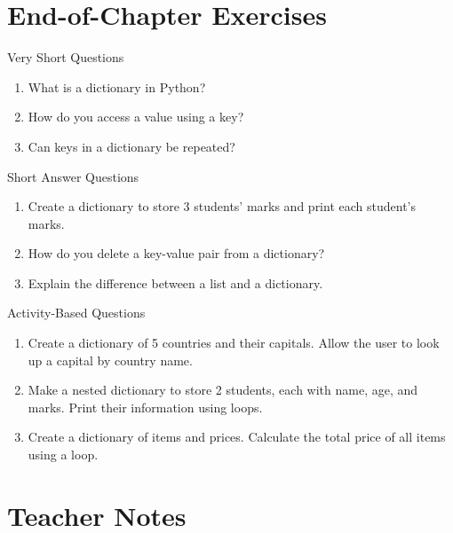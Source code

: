 \section{End-of-Chapter Exercises}

\begin{exercise}{Very Short Questions}
\begin{enumerate}
    \item What is a dictionary in Python?  
    \item How do you access a value using a key?  
    \item Can keys in a dictionary be repeated?  
\end{enumerate}
\end{exercise}

\begin{exercise}{Short Answer Questions}
\begin{enumerate}
    \item Create a dictionary to store 3 students’ marks and print each student’s marks.  
    \item How do you delete a key-value pair from a dictionary?  
    \item Explain the difference between a list and a dictionary.  
\end{enumerate}
\end{exercise}

\begin{exercise}{Activity-Based Questions}
\begin{enumerate}
    \item Create a dictionary of 5 countries and their capitals. Allow the user to look up a capital by country name.  
    \item Make a nested dictionary to store 2 students, each with name, age, and marks. Print their information using loops.  
    \item Create a dictionary of items and prices. Calculate the total price of all items using a loop.  
\end{enumerate}
\end{exercise}

\section{Teacher Notes}

